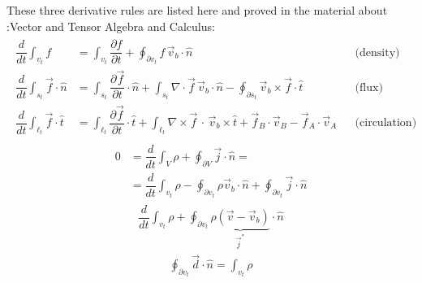 \documentclass[letterpaper,10pt,english]{jupyterBook}
\begin{document}
\sphinxAtStartPar
These three derivative rules are listed here and proved in the material about :Vector and Tensor Algebra and Calculus:
\begin{equation*}
\begin{split}\begin{aligned}
  \dfrac{d}{dt} \int_{v_t} f & = \int_{v_t} \dfrac{\partial f}{\partial t} + \oint_{\partial v_t} f \, \vec{v}_b \cdot \hat{n} && \text{(density)} \\
  \dfrac{d}{dt} \int_{s_t} \vec{f} \cdot \hat{n} & = \int_{s_t} \dfrac{\partial \vec{f}}{\partial t} \cdot \hat{n} + \int_{s_t} \nabla \cdot \vec{f} \, \vec{v}_b \cdot \hat{n} - \oint_{\partial s_t} \vec{v}_b \times \vec{f} \cdot \hat{t} && \text{(flux)} \\
  \dfrac{d}{dt} \int_{\ell_t} \vec{f} \cdot \hat{t} & = \int_{\ell_t} \dfrac{\partial \vec{f}}{\partial t} \cdot \hat{t} + \int_{\ell_t} \nabla \times \vec{f} \, \cdot \, \vec{v}_b \times \hat{t} + \vec{f}_B \cdot \vec{v}_B - \vec{f}_A \cdot \vec{v}_A && \text{(circulation)}
\end{aligned}\end{split}
\end{equation*}
\sphinxAtStartPar
{}
\begin{equation*}
\begin{split}\begin{aligned}
   0 & = \dfrac{d}{dt} \int_{V} \rho + \oint_{\partial V} \vec{j} \cdot \hat{n} = \\
   & = \dfrac{d}{dt} \int_{v_t} \rho - \oint_{\partial v_t } \rho \vec{v}_b \cdot \hat{n} + \oint_{\partial v_t} \vec{j} \cdot \hat{n} 
\end{aligned}\end{split}
\end{equation*}\begin{equation*}
\begin{split}
    \dfrac{d}{dt} \int_{v_t} \rho + \oint_{\partial v_t} \underbrace{\rho (\vec{v} - \vec{v}_b)}_{\vec{j}^*} \cdot \hat{n} 
\end{split}
\end{equation*}
\sphinxAtStartPar
{}
\begin{equation*}
\begin{split}
    \oint_{\partial v_t} \vec{d} \cdot \hat{n} = \int_{v_t} \rho
\end{split}
\end{equation*}
\end{document}
